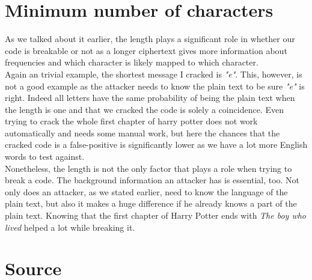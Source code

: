 \documentclass[12pt]{article}
\begin{document}
\section*{Minimum number of characters}
As we talked about it earlier, the length plays a significant role in whether our code is breakable or not as a longer ciphertext gives more information about frequencies and which character is likely mapped to which character.\\
Again an trivial example, the shortest message I cracked is \emph{"e"}. This, however, is not a good example as the attacker needs to know the plain text to be sure \emph{"e"} is right. Indeed all letters have the same probability of being the plain text when the length is one and that we cracked the code is solely a coincidence.
Even trying to crack the whole first chapter of harry potter does not work automatically and needs some manual work, but here the chances that the cracked code is a false-positive is significantly lower as we have a lot more English words to test against.\\
Nonetheless, the length is not the only factor that plays a role when trying to break a code. The background information an attacker has is essential, too. Not only does an attacker, as we stated earlier, need to know the language of the plain text, but also it makes a huge difference if he already knows a part of the plain text. Knowing that the first chapter of Harry Potter ends with \emph{The boy who lived} helped a lot while breaking it.

\section*{Source}


\end{document}
